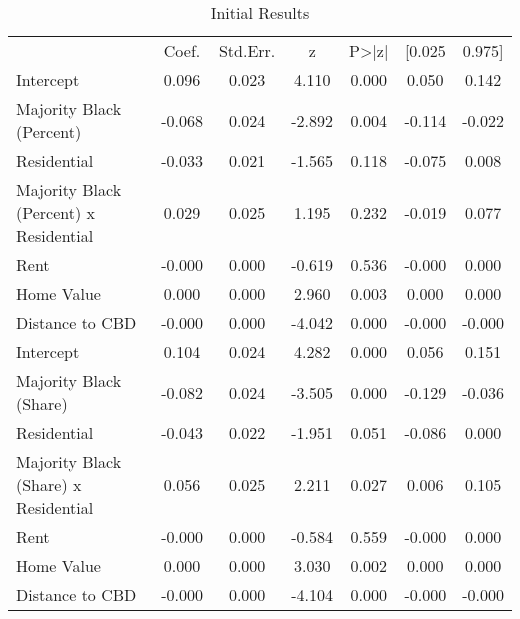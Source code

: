 \begin{table}[h]
\centering
\caption{Initial Results}
\label{tab:initial_results}
\begin{tabular}{lcccccc}
 & Coef. & Std.Err. & z & P>|z| & [0.025 & 0.975] \\
Intercept & 0.096 & 0.023 & 4.110 & 0.000 & 0.050 & 0.142 \\
Majority Black (Percent) & -0.068 & 0.024 & -2.892 & 0.004 & -0.114 & -0.022 \\
Residential & -0.033 & 0.021 & -1.565 & 0.118 & -0.075 & 0.008 \\
Majority Black (Percent) x Residential & 0.029 & 0.025 & 1.195 & 0.232 & -0.019 & 0.077 \\
Rent & -0.000 & 0.000 & -0.619 & 0.536 & -0.000 & 0.000 \\
Home Value & 0.000 & 0.000 & 2.960 & 0.003 & 0.000 & 0.000 \\
Distance to CBD & -0.000 & 0.000 & -4.042 & 0.000 & -0.000 & -0.000 \\
Intercept & 0.104 & 0.024 & 4.282 & 0.000 & 0.056 & 0.151 \\
Majority Black (Share) & -0.082 & 0.024 & -3.505 & 0.000 & -0.129 & -0.036 \\
Residential & -0.043 & 0.022 & -1.951 & 0.051 & -0.086 & 0.000 \\
Majority Black (Share) x Residential & 0.056 & 0.025 & 2.211 & 0.027 & 0.006 & 0.105 \\
Rent & -0.000 & 0.000 & -0.584 & 0.559 & -0.000 & 0.000 \\
Home Value & 0.000 & 0.000 & 3.030 & 0.002 & 0.000 & 0.000 \\
Distance to CBD & -0.000 & 0.000 & -4.104 & 0.000 & -0.000 & -0.000 \\
\end{tabular}
\end{table}
